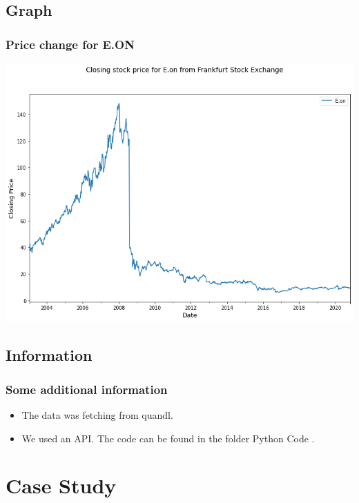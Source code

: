 \documentclass{beamer}
\begin{document}
\subsection{Graph}
\begin{frame}
\frametitle{Price change for E.ON}
\begin{center}
	\includegraphics[scale=0.35]{images/Stock_Eon.png}
\end{center}
\end{frame}

\subsection{Information}
\begin{frame}
	\frametitle{Some additional information}
	\begin{itemize}
		\item The data was fetching from quandl.
		\item We used an API. The code can be found in the folder Python Code \cite{p1}.
		
	\end{itemize}
\end{frame}


\section{Case Study}
\end{document}
